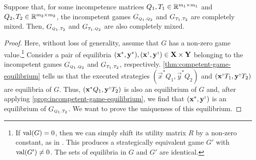     \begin{proposition} \label{prop:completely-mixed-interchangability}
        Suppose that, for some incompetence matrices $Q_1, T_1 \in \mathbb{R}^{m_1 \times m_1}$ and $Q_2, T_2 \in \mathbb{R}^{m_2 \times m_2}$, the incompetent games $G_\ms{Q_1, Q_2}$ and $G_\ms{T_1, T_2}$ are completely mixed.
        Then, $G_{\ms{Q_1, T_2}}$ and $G_{\ms{T_1, Q_2}}$ are also completely mixed.
    \end{proposition}

    \begin{proof}
        Here, without loss of generality, assume that $G$ has a non-zero game value.\footnote{
            If $\operatorname{val}(G) = 0$, then we can simply shift its utility matrix $R$ by a non-zero constant, as in \parencite[Theorem 5.35]{Maschler2013}.
            This produces a strategically equivalent game $G'$ with $\operatorname{val}(G') \neq 0$.
            The sets of equilibria in $G$ and $G'$ are identical.
        }
        Consider a pair of equilibria $(\vec{x}^*, \vec{y}^*), (\vec{x}^\sdagger, \vec{y}^\sdagger) \in \vec{X} \times \vec{Y}$ belonging to the incompetent games $G_\ms{Q_1, Q_2}$ and $G_\ms{T_1, T_2}$, respectively.
        \autoref{thm:competent-game-equilibrium} tells us that the executed strategies $(\vec{x}^* Q_1, \vec{y}^* Q_2)$ and $(\vec{x}^\sdagger T_1, \vec{y}^\sdagger T_2)$ are equilibria of $G$.
        Thus, $(\vec{x}^* Q_1, \vec{y}^\sdagger T_2)$ is also an equilibrium of $G$ and, after applying \autoref{prop:incompetent-game-equilibrium}, we find that $(\vec{x}^*, \vec{y}^\sdagger)$ is an equilibrium of $G_\ms{Q_1, T_2}$.
        We want to prove the uniqueness of this equilibrium.


\end{proof}
